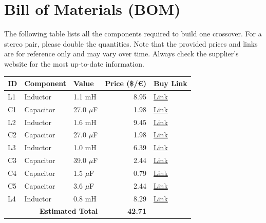 \documentclass[11pt,a4paper]{report}
\begin{document}
\chapter{Bill of Materials (BOM)}
The following table lists all the components required to build one crossover. For a stereo pair, please double the quantities. Note that the provided prices and links are for reference only and may vary over time. Always check the supplier's website for the most up-to-date information.

\vspace{0.5cm}
\begin{table}[H]
    \centering
    \renewcommand{\arraystretch}{1.5}
    \begin{tabular}{@{}lllrl@{}}
        \toprule
        \textbf{ID} & \textbf{Component} & \textbf{Value} & \textbf{Price (\$/€)} & \textbf{Buy Link} \\
        \midrule
        L1 & Inductor & 1.1 mH & 8.95 & \href{https://www.soundimports.eu/en/jantzen-audio-000-2343.html}{Link} \\
        C1 & Capacitor & 27.0 $\mu$F & 1.98 & \href{https://www.soundimports.eu/en/jantzen-audio-001-6150.html}{Link} \\
        L2 & Inductor & 1.6 mH & 9.45 & \href{https://www.soundimports.eu/en/jantzen-audio-000-2389.html}{Link} \\
        C2 & Capacitor & 27.0 $\mu$F & 1.98 & \href{https://www.soundimports.eu/en/jantzen-audio-001-6150.html}{Link} \\
        L3 & Inductor & 1.0 mH & 6.39 & \href{https://www.parts-express.com/Dayton-Audio-IC181-1.0mH-18-AWG-Laminated-Iron-Core-Inductor-257-650}{Link} \\
        C3 & Capacitor & 39.0 $\mu$F & 2.44 & \href{https://www.soundimports.eu/en/jantzen-audio-001-6156.html}{Link} \\
        C4 & Capacitor & 1.5 $\mu$F & 0.79 & \href{https://www.parts-express.com/Solen-1.5uF-400V-Polypropylene-Capacitor-027-528}{Link} \\
        C5 & Capacitor & 3.6 $\mu$F & 2.44 & \href{https://www.soundimports.eu/en/jantzen-audio-001-0244.html}{Link} \\
        L4 & Inductor & 0.8 mH & 8.29 & \href{https://www.parts-express.com/Dayton-Audio-LW18-80-0.80mH-18-AWG-Perfect-Layer-Inductor-257-822}{Link} \\
        \midrule
        \multicolumn{3}{r}{\textbf{Estimated Total}} & \textbf{42.71} & \\
        \bottomrule
    \end{tabular}
\end{table}
\end{document}
